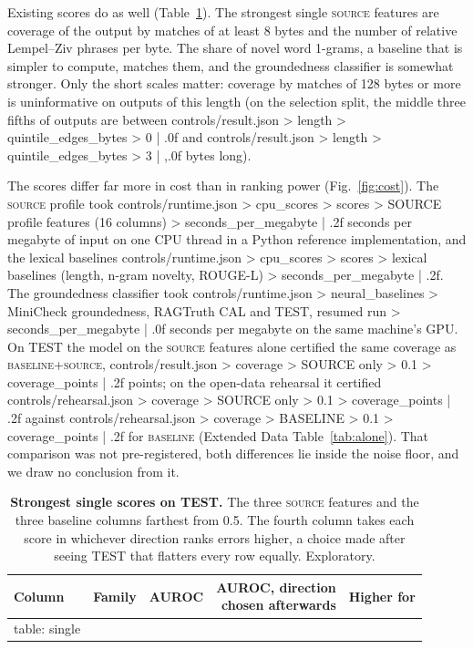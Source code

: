 \documentclass[11pt]{article}
\newcommand{\arm}[1]{\textsc{#1}}
\begin{document}
Existing scores do as well (Table~\ref{tab:single}). The strongest single \arm{source} features are coverage of the output by matches of at least 8 bytes and the number of relative Lempel--Ziv phrases per byte. The share of novel word 1-grams, a baseline that is simpler to compute, matches them, and the groundedness classifier is somewhat stronger. Only the short scales matter: coverage by matches of 128 bytes or more is uninformative on outputs of this length (on the selection split, the middle three fifths of outputs are between {{controls/result.json > length > quintile_edges_bytes > 0 | .0f}} and {{controls/result.json > length > quintile_edges_bytes > 3 | ,.0f}} bytes long).

The scores differ far more in cost than in ranking power (Fig.~\ref{fig:cost}). The \arm{source} profile took {{controls/runtime.json > cpu_scores > scores > SOURCE profile features (16 columns) > seconds_per_megabyte | .2f}} seconds per megabyte of input on one CPU thread in a Python reference implementation, and the lexical baselines {{controls/runtime.json > cpu_scores > scores > lexical baselines (length, n-gram novelty, ROUGE-L) > seconds_per_megabyte | .2f}}. The groundedness classifier took {{controls/runtime.json > neural_baselines > MiniCheck groundedness, RAGTruth CAL and TEST, resumed run > seconds_per_megabyte | .0f}} seconds per megabyte on the same machine's GPU. On TEST the model on the \arm{source} features alone certified the same coverage as \arm{baseline+source}, {{controls/result.json > coverage > SOURCE only > 0.1 > coverage_points | .2f}} points; on the open-data rehearsal it certified {{controls/rehearsal.json > coverage > SOURCE only > 0.1 > coverage_points | .2f}} against {{controls/rehearsal.json > coverage > BASELINE > 0.1 > coverage_points | .2f}} for \arm{baseline} (Extended Data Table~\ref{tab:alone}). That comparison was not pre-registered, both differences lie inside the noise floor, and we draw no conclusion from it.

\begin{table}[t]
\centering
\small
\caption{\textbf{Strongest single scores on TEST.} The three \arm{source} features and the three baseline columns farthest from 0.5. The fourth column takes each score in whichever direction ranks errors higher, a choice made after seeing TEST that flatters every row equally. Exploratory.}
\label{tab:single}
\begin{tabular}{@{}llrrl@{}}
\toprule
Column & Family & AUROC & \shortstack[r]{AUROC, direction\\chosen afterwards} & Higher for \\
\midrule
{{table: single}}
\bottomrule
\end{tabular}
\end{table}
\end{document}
